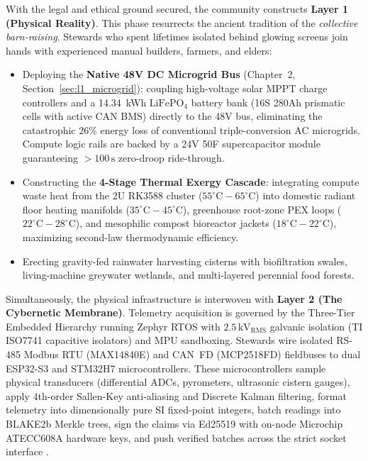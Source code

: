 With the legal and ethical ground secured, the community constructs \textbf{Layer 1 (Physical Reality)}. This phase resurrects the ancient tradition of the \textit{collective barn-raising}. Stewards who spent lifetimes isolated behind glowing screens join hands with experienced manual builders, farmers, and elders:
\begin{itemize}
    \item Deploying the \textbf{Native 48V DC Microgrid Bus} (Chapter~2, Section~\ref{sec:l1_microgrid}): coupling high-voltage solar MPPT charge controllers and a 14.34~kWh $\mathrm{LiFePO}_4$ battery bank (16S 280Ah prismatic cells with active CAN BMS) directly to the 48V bus, eliminating the catastrophic $26\%$ energy loss of conventional triple-conversion AC microgrids. Compute logic rails are backed by a 24V 50F supercapacitor module guaranteeing $>100\,\mathrm{s}$ zero-droop ride-through.
    \item Constructing the \textbf{4-Stage Thermal Exergy Cascade}: integrating compute waste heat from the 2U RK3588 cluster ($55^\circ\mathrm{C}-65^\circ\mathrm{C}$) into domestic radiant floor heating manifolds ($35^\circ\mathrm{C}-45^\circ\mathrm{C}$), greenhouse root-zone PEX loops ($22^\circ\mathrm{C}-28^\circ\mathrm{C}$), and mesophilic compost bioreactor jackets ($18^\circ\mathrm{C}-22^\circ\mathrm{C}$), maximizing second-law thermodynamic efficiency.
    \item Erecting gravity-fed rainwater harvesting cisterns with biofiltration swales, living-machine greywater wetlands, and multi-layered perennial food forests.
\end{itemize}

Simultaneously, the physical infrastructure is interwoven with \textbf{Layer 2 (The Cybernetic Membrane)}. Telemetry acquisition is governed by the Three-Tier Embedded Hierarchy running Zephyr RTOS with $2.5\,\mathrm{kV}_{\mathrm{RMS}}$ galvanic isolation (TI ISO7741 capacitive isolators) and MPU sandboxing. Stewards wire isolated RS-485 Modbus RTU (MAX14840E) and CAN~FD (MCP2518FD) fieldbuses to dual ESP32-S3 and STM32H7 microcontrollers. These microcontrollers sample physical transducers (differential ADCs, pyrometers, ultrasonic cistern gauges), apply 4th-order Sallen-Key anti-aliasing and Discrete Kalman filtering, format telemetry into dimensionally pure SI fixed-point integers, batch readings into BLAKE2b Merkle trees, sign the claims via Ed25519 with on-node Microchip ATECC608A hardware keys, and push verified batches across the strict socket interface .

